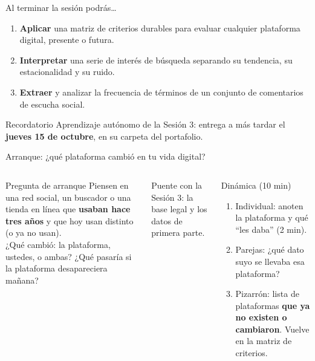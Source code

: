 \documentclass[aspectratio=169,xcolor=dvipsnames]{beamer}
\begin{document}
\begin{frame}{Al terminar la sesión podrás\ldots}
\begin{enumerate}
  \item \textbf{Aplicar} una matriz de criterios durables para evaluar cualquier plataforma digital, presente o futura.
  \vspace{6pt}
  \item \textbf{Interpretar} una serie de interés de búsqueda separando su tendencia, su estacionalidad y su ruido.
  \vspace{6pt}
  \item \textbf{Extraer} y analizar la frecuencia de términos de un conjunto de comentarios de escucha social.
\end{enumerate}
\vspace{8pt}
\begin{alertblock}{Recordatorio}
  Aprendizaje autónomo de la Sesión 3: entrega a más tardar el \textbf{jueves 15 de octubre}, en su carpeta del portafolio.
\end{alertblock}
\end{frame}

\begin{frame}{Arranque: ¿qué plataforma cambió en tu vida digital?}
\begin{columns}[T]
  \begin{exampleblock}{Pregunta de arranque}
    Piensen en una red social, un buscador o una tienda en línea que \textbf{usaban hace tres años} y que hoy usan distinto (o ya no usan).\\[4pt]
    ¿Qué cambió: la plataforma, ustedes, o ambas? ¿Qué pasaría si la plataforma desapareciera mañana?
  \end{exampleblock}
  \vspace{4pt}
  {\small\color{IPNgris} Puente con la Sesión 3: la base legal y los datos de primera parte.}
  \begin{block}{Dinámica (10 min)}
    \small
    \begin{enumerate}
      \item Individual: anoten la plataforma y qué \enquote{les daba} (2 min).
      \item Parejas: ¿qué dato suyo se llevaba esa plataforma?
      \item Pizarrón: lista de plataformas \textbf{que ya no existen o cambiaron}. Vuelve en la matriz de criterios.
    \end{enumerate}
  \end{block}
\end{columns}
\end{frame}
\end{document}
